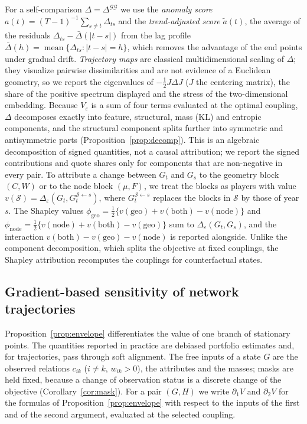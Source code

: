 \documentclass[12pt]{article}
\theoremstyle{definition}
\begin{document}
For a self-comparison $\Delta=\Delta^{\mathcal G\mathcal G}$ we use the \emph{anomaly score} $a(t)=(T-1)^{-1}\sum_{s\ne t}\Delta_{ts}$ and the \emph{trend-adjusted score} $\tilde a(t)$, the average of the residuals $\Delta_{ts}-\bar\Delta(|t-s|)$ from the lag profile $\bar\Delta(h)=\operatorname{mean}\{\Delta_{ts}:|t-s|=h\}$, which removes the advantage of the end points under gradual drift. \emph{Trajectory maps} are classical multidimensional scaling \citep{torgerson1952multidimensional} of $\Delta$; they visualize pairwise dissimilarities and are not evidence of a Euclidean geometry, so we report the eigenvalues of $-\frac12J\Delta J$ ($J$ the centering matrix), the share of the positive spectrum displayed and the stress of the two-dimensional embedding. Because $V_\varepsilon$ is a sum of four terms evaluated at the optimal coupling, $\Delta$ decomposes exactly into feature, structural, mass (KL) and entropic components, and the structural component splits further into symmetric and antisymmetric parts (Proposition~\ref{prop:decomp}). This is an algebraic decomposition of signed quantities, not a causal attribution; we report the signed contributions and quote shares only for components that are non-negative in every pair. To attribute a change between $G_t$ and $G_s$ to the geometry block $(C,W)$ or to the node block $(\mu,F)$, we treat the blocks as players with value $v(\mathcal S)=\Delta_\varepsilon(G_t,G_t^{\mathcal S\leftarrow s})$, where $G_t^{\mathcal S\leftarrow s}$ replaces the blocks in $\mathcal S$ by those of year $s$. The Shapley values $\phi_{\mathrm{geo}}=\frac12\{v(\mathrm{geo})+v(\mathrm{both})-v(\mathrm{node})\}$ and $\phi_{\mathrm{node}}=\frac12\{v(\mathrm{node})+v(\mathrm{both})-v(\mathrm{geo})\}$ sum to $\Delta_\varepsilon(G_t,G_s)$, and the interaction $v(\mathrm{both})-v(\mathrm{geo})-v(\mathrm{node})$ is reported alongside. Unlike the component decomposition, which splits the objective at fixed couplings, the Shapley attribution recomputes the couplings for counterfactual states.

\subsection{Gradient-based sensitivity of network trajectories}\label{sec:sensitivity}

Proposition~\ref{prop:envelope} differentiates the value of one branch of stationary points. The quantities reported in practice are debiased portfolio estimates and, for trajectories, pass through soft alignment. The free inputs of a state $G$ are the observed relations $c_{ik}$ ($i\neq k$, $w_{ik}>0$), the attributes and the masses; masks are held fixed, because a change of observation status is a discrete change of the objective (Corollary~\ref{cor:mask}). For a pair $(G,H)$ we write $\partial_1V$ and $\partial_2V$ for the formulas of Proposition~\ref{prop:envelope} with respect to the inputs of the first and of the second argument, evaluated at the selected coupling.
\end{document}

